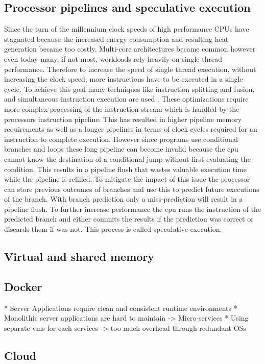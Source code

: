 \documentclass[conference,compsoc,final,a4paper]{IEEEtran}
\begin{document}
\subsection{Processor pipelines and speculative execution}
Since the turn of the millennium clock speeds of high performance CPUs have stagnated because the increased energy consumption and resulting heat generation became
too costly. \cite{fog2012microarchitecture} Multi-core architectures became common however even today many, if not most,
workloads rely heavily on single thread performance. Therefore to increase the speed of single thread execution, without increasing the clock speed,
more instructions have to be executed in a single cycle. To achieve this goal many techniques like instruction splitting and fusion,
and simultaneous instruction execution are used \cite{fog2012microarchitecture}. These optimizations require more complex processing of the instruction stream which
is handled by the processors instruction pipeline. This has resulted in higher pipeline memory requirements as well as a longer pipelines in terms of clock cycles
required for an instruction to complete execution. However since programs use conditional branches and loops these long pipeline can become invalid because the cpu
cannot know the destination of a conditional jump without first evaluating the condition. This results in a pipeline flush that wastes valuable execution time while
the pipeline is refilled. To mitigate the impact of this issue the processor can store previous outcomes of branches and use this to predict future executions of the
branch. With branch prediction only a miss-prediction will result in a pipeline flush. To further increase performance the cpu runs the instruction of 
the predicted branch and either commits the results if the prediction was correct or discards them if was not. 
This process is called speculative execution. \cite{kocher2018spectre}
\subsection{Virtual and shared memory}

\subsection{Docker}
* Server Applications require clean and consistent runtime environments
* Monolithic server applications are hard to maintain -> Micro-services
* Using separate vms for each services -> too much overhead through redundant OSs
\subsection{Cloud}
\end{document}
